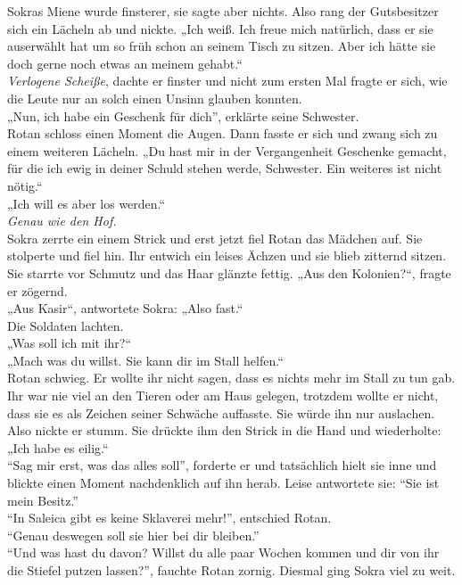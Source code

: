 Sokras Miene wurde finsterer, sie sagte aber nichts. Also rang der Gutsbesitzer sich ein Lächeln ab 
und nickte. „Ich weiß. Ich freue mich natürlich, dass er sie auserwählt hat um so früh schon an 
seinem Tisch zu sitzen. Aber ich hätte sie doch gerne noch etwas an meinem gehabt.“\\
\textit{Verlogene Scheiße}, dachte er finster und nicht zum ersten Mal fragte er sich, wie die 
Leute nur an solch einen Unsinn glauben konnten.\\
„Nun, ich habe ein Geschenk für dich'', erklärte seine Schwester.\\
Rotan schloss einen Moment die Augen. Dann fasste er sich und zwang sich zu einem weiteren Lächeln. 
„Du hast mir in der Vergangenheit Geschenke gemacht, für die ich ewig in deiner Schuld stehen 
werde, Schwester. Ein weiteres ist nicht nötig.“\\
„Ich will es aber los werden.“\\
\textit{Genau wie den Hof.}\\
Sokra zerrte ein einem Strick und erst jetzt fiel Rotan das Mädchen auf. Sie stolperte und fiel 
hin. Ihr entwich ein leises Ächzen und sie blieb zitternd sitzen. Sie starrte vor Schmutz und das 
Haar glänzte fettig. „Aus den Kolonien?“, fragte er zögernd.\\
„Aus Kasir“, antwortete Sokra: „Also fast.“\\
Die Soldaten lachten. \\
„Was soll ich mit ihr?“\\
„Mach was du willst. Sie kann dir im Stall helfen.“\\
Rotan schwieg. Er wollte ihr nicht sagen, dass es nichts mehr im Stall zu tun gab. Ihr war nie viel 
an den Tieren oder am Haus gelegen, trotzdem wollte er nicht, dass sie es als Zeichen seiner 
Schwäche auffasste. Sie würde ihn nur auslachen. Also nickte er stumm. Sie drückte ihm den Strick 
in die Hand und wiederholte: „Ich habe es eilig.“\\
``Sag mir erst, was das alles soll'', forderte er und tatsächlich hielt sie inne und blickte einen 
Moment nachdenklich auf ihn herab. Leise antwortete sie: ``Sie ist mein Besitz.''\\
``In Saleica gibt es keine Sklaverei mehr!'', entschied Rotan.\\
``Genau deswegen soll sie hier bei dir bleiben.''\\
``Und was hast du davon? Willst du alle paar Wochen kommen und dir von ihr die Stiefel putzen 
lassen?'', fauchte Rotan zornig. Diesmal ging Sokra viel zu weit.\\
